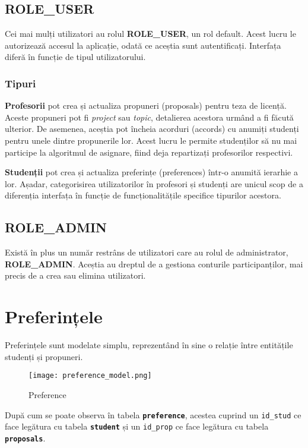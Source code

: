 \subsection{ROLE\_USER}

Cei mai mulți utilizatori au rolul \textbf{ROLE\_USER}, un rol default. Acest lucru le autorizează accesul la aplicație, odată ce aceștia sunt autentificați. Interfața diferă în funcție de tipul utilizatorului.

\subsubsection{Tipuri}

\textbf{Profesorii} pot crea și actualiza propuneri (proposals) pentru teza de licență. Aceste propuneri pot fi \textit{project} sau \textit{topic}, detalierea acestora urmând a fi făcută ulterior. De asemenea, aceștia pot încheia acorduri (accords) cu anumiți studenți pentru unele dintre propunerile lor. Acest lucru le permite studenților să nu mai participe la algoritmul de asignare, fiind deja repartizați profesorilor respectivi.

\textbf{Studenții} pot crea și actualiza preferințe (preferences) într-o anumită ierarhie a lor. Așadar, categorisirea utilizatorilor în profesori și studenți are unicul scop de a diferenția interfața în funcție de funcționalitățile specifice tipurilor acestora.


\subsection{ROLE\_ADMIN}

Există în plus un număr restrâns de utilizatori care au rolul de administrator, \textbf{ROLE\_ADMIN}. Aceștia au dreptul de a gestiona conturile participanților, mai precis de a crea sau elimina utilizatori.

\section{Preferințele}

Preferințele sunt modelate simplu, reprezentând în sine o relație între entitățile studenți și propuneri.

\begin{figure}[H]
	\centering
	\texttt{[image: preference\_model.png]}
	\caption{Preference}
\end{figure}

După cum se poate observa în tabela \textbf{\texttt{preference}}, acestea cuprind un \texttt{id\_stud} ce face legătura cu tabela \textbf{\texttt{student}} și un \texttt{id\_prop} ce face legătura cu tabela \textbf{\texttt{proposals}}.


